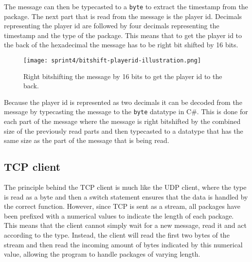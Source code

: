 The message can then be typecasted to a \texttt{byte} to extract the timestamp from the package.
The next part that is read from the message is the player id.
Decimals representing the player id are followed by four decimals representing the timestamp and the type of the package.
This means that to get the player id to the back of the hexadecimal the message has to be right bit shifted by 16 bits.
\begin{figure}[H]
    \centering
    \texttt{[image: sprint4/bitshift-playerid-illustration.png]}
    \caption{Right bitshifting the message by 16 bits to get the player id to the back.}
    \label{fig:sprint4-bitshift-playerid}
\end{figure}
Because the player id is represented as two decimals it can be decoded from the message by typecasting the message to the \texttt{byte} datatype in C\#.
This is done for each part of the message where the message is right bitshifted by the combined size of the previously read parts and then typecasted to a datatype that has the same size as the part of the message that is being read.
\subsection*{TCP client}
The principle behind the TCP client is much like the UDP client, where the type is read as a byte and then a switch statement ensures that the data is handled by the correct function.
However, since TCP is sent as a stream, all packages have been prefixed with a numerical values to indicate the length of each package.
This means that the client cannot simply wait for a new message, read it and act according to the type.
Instead, the client will read the first two bytes of the stream and then read the incoming amount of bytes indicated by this numerical value, allowing the program to handle packages of varying length.

